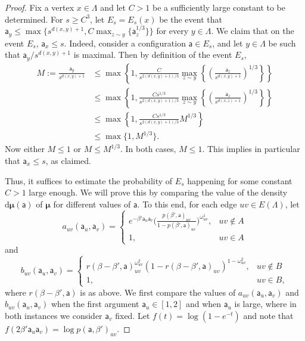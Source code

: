 \documentclass[11pt,a4paper]{article}
\theoremstyle{definition}
\numberwithin{equation}{section}
\begin{document}
\begin{proof}
Fix a vertex $x\in \Lambda$ and let $C>1$ be a sufficiently large constant to be determined. For $s\geq C^3$, let $E_s=E_s(x)$ be the event that $\mathsf{a}_y\leq \max\{s^{d(x,y)+1}, C\max_{z\sim y}\{\mathsf{a}_z^{1/3}\}\}$ for every $y \in \Lambda$.
We claim that on the event $E_s$, $\mathsf{a}_x\leq s$. Indeed, consider a configuration $\mathsf a\in E_s$, and let $y\in \Lambda$ be such that $\mathsf a_y/s^{d(x,y)+1}$ is maximal. Then by definition of the event $E_s$, 
\begin{equation}
\begin{aligned}
M:=\frac{\mathsf{a}_y}{s^{d(x,y)+1}}&\leq \max\left\{1, \frac{C}{s^{2(d(x,y)+1)/3}}\max_{z\sim y}\left\{\left(\frac{\mathsf{a}_z}{s^{d(x,y)+1}}\right)^{1/3}\right\}\right\}\\ 
&\leq \max\left\{1, \frac{Cs^{1/3}}{s^{2(d(x,y)+1)/3}} \max_{z\sim y}\left\{\left(\frac{\mathsf{a}_z}{s^{d(x,z)+1}}\right)^{1/3}\right\}\right\}\\
&\leq \max\left\{1, \frac{Cs^{1/3}}{s^{2(d(x,y)+1)/3}} M^{1/3}\right\}\\
&\leq \max\{1, M^{1/3}\}.
\end{aligned}
\end{equation}
Now either $M\leq 1$ or $M\leq M^{1/3}$. In both cases, $M\leq 1$. This implies in particular that $\mathsf{a}_x\leq s$, as claimed.

Thus, it suffices to estimate the probability of $E_s$ happening for some constant $C>1$ large enough. We will prove this by comparing the value of the density $\mathrm{d}\boldsymbol{\mu}(\mathsf{a})$ of $\boldsymbol{\mu}$ for different values of $\mathsf{a}$. To this end,
for each edge $uv \in E(\Lambda)$, let
\begin{equation}\label{eq: a definition}
a_{uv}(\mathsf{a}_u,\mathsf{a}_v)=
\begin{cases}
e^{-\beta' \mathsf{a}_u \mathsf{a}_v}\Big(\frac{p(\beta',\mathsf{a})_{uv}}{1-p(\beta',\mathsf{a})_{uv}}\Big)^{\omega^1_{uv}}, & uv\not\in A\\
1, & uv\in A
\end{cases}
\end{equation}
and
\begin{equation}\label{eq: b definition}
b_{uv}(\mathsf{a}_u,\mathsf{a}_v)=
\begin{cases}
r(\beta-\beta',\mathsf{a})^{\omega^2_{uv}}_{uv}\left(1-r(\beta-\beta',\mathsf{a})_{uv}\right)^{1-\omega^2_{uv}}, & uv\not\in B\\
1, & uv\in B,
\end{cases}
\end{equation}
where $r(\beta-\beta',\mathsf{a})$ is as above.  We first compare the values of $a_{uv}(\mathsf{a}_u,\mathsf{a}_v)$ and $b_{uv}(\mathsf{a}_u,\mathsf{a}_v)$ when the first argument $\mathsf{a}_u\in [1,2]$ and when $\mathsf{a}_u$ is large, where in both instances we consider $\mathsf a_v$ fixed. Let $f(t)=\log(1-e^{-t})$ and note that $f(2\beta'\mathsf a_u \mathsf a_v)=\log p(\mathsf a, \beta')_{uv}$.



\end{proof}
\end{document}
